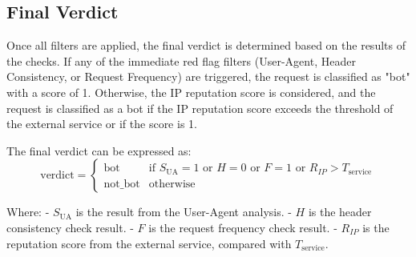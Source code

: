 \documentclass[12pt,a4paper]{article}
\begin{document}
\subsection{Final Verdict}

Once all filters are applied, the final verdict is determined based on the results of the checks. If any of the immediate red flag filters (User-Agent, Header Consistency, or Request Frequency) are triggered, the request is classified as "bot" with a score of 1. Otherwise, the IP reputation score is considered, and the request is classified as a bot if the IP reputation score exceeds the threshold of the external service or if the score is 1. 

The final verdict can be expressed as:
\[
\text{verdict} = 
\begin{cases} 
\text{bot} & \text{if } S_{\text{UA}} = 1 \text{ or } H = 0 \text{ or } F = 1 \text{ or } R_{IP} > T_{\text{service}} \\
\text{not\_bot} & \text{otherwise}
\end{cases}
\]

Where: \newline
- \( S_{\text{UA}} \) is the result from the User-Agent analysis. \newline
- \( H \) is the header consistency check result. \newline
- \( F \) is the request frequency check result. \newline
- \( R_{IP} \) is the reputation score from the external service, compared with \( T_{\text{service}} \).
\end{document}
